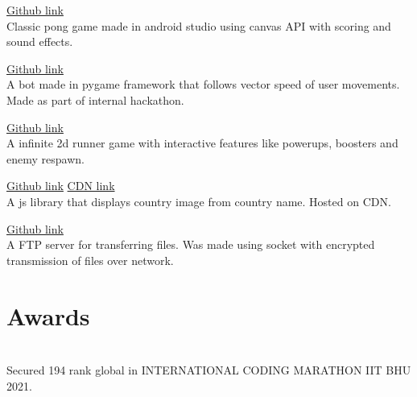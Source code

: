 \documentclass[]{deedy-resume-openfont}
\begin{document}
\begin{minipage}[t]{0.66\textwidth}
\hfill \href{https://github.com/jaiakash/PongGame}{Github link}\\
Classic pong game made in android studio using canvas API with scoring and sound effects.\\
\sectionsep
  

\hfill \href{https://github.com/jaiakash/spiddysense2021\_Akash}{Github link}\\
A bot made in pygame framework that follows vector speed of user movements. Made as part of internal hackathon.\\
\sectionsep
  

\hfill \href{https://github.com/jaiakash/NinjaVsSal}{Github link}\\
A infinite 2d runner game with interactive features like powerups, boosters and enemy respawn.\\
\sectionsep
  

\hfill \href{https://github.com/jaiakash/countryFlag}{Github link} \href{https://cdn.jsdelivr.net/gh/jaiakash/countryFlag@master/countryFlag.js}{CDN link}\\
A js library that displays country image from country name. Hosted on CDN.\\
\sectionsep
  

\hfill \href{https://github.com/jaiakash/alphaq-file-server}{Github link}\\
A FTP server for transferring files. Was made using socket with encrypted transmission of files over network.\\
\sectionsep
%
%
\section{Awards}
  \\
Secured 194 rank global in INTERNATIONAL CODING MARATHON IIT BHU 2021.\\
\sectionsep
{}  \\


\end{minipage}
\end{document}
